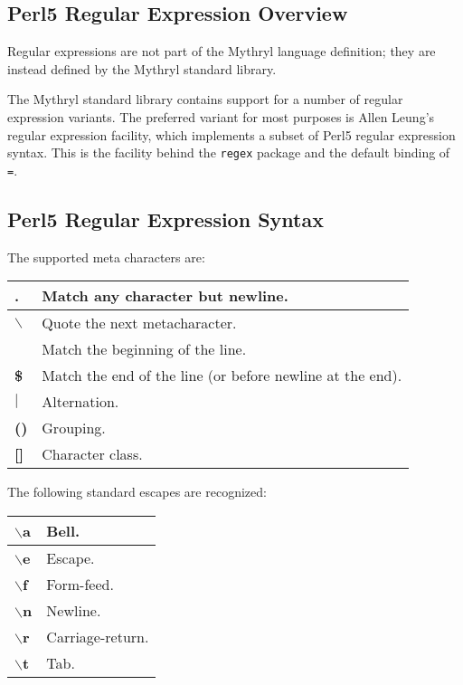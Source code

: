\subsection{Perl5 Regular Expression Overview}
\label{section:libref:perl5-regular-expressions:overview}

Regular expressions are not part of the Mythryl language definition; 
they are instead defined by the Mythryl standard library.

The Mythryl standard library contains support for a number of 
regular expression variants.  The preferred variant for most 
purposes is Allen Leung's regular expression facility, which 
implements a subset of Perl5 regular expression syntax. 
This is the facility behind the {\tt regex} package and 
the default binding of {\tt =}.

\cutend*

\subsection{Perl5 Regular Expression Syntax}
\label{section:libref:perl5-regular-expressions}

The supported meta characters are:

\begin{tabular}{|l|l|} \hline
{\bf .} &  Match any character but newline. \\ \hline
{\bf $\backslash$} &  Quote the next metacharacter. \\ \hline
{\bf \char94} &  Match the beginning of the line. \\ \hline
{\bf \$} &  Match the end of the line (or before newline at the end). \\ \hline
{\bf $|$} &  Alternation. \\ \hline
{\bf ()} & Grouping. \\ \hline
{\bf []} & Character class. \\ \hline
\end{tabular}

The following standard escapes are recognized: 

\begin{tabular}{|l|l|} \hline
{\bf $\backslash$a} &  Bell. \\ \hline
{\bf $\backslash$e} &  Escape. \\ \hline
{\bf $\backslash$f} &  Form-feed. \\ \hline
{\bf $\backslash$n} &  Newline. \\ \hline
{\bf $\backslash$r} &  Carriage-return. \\ \hline
{\bf $\backslash$t} &  Tab. \\ \hline
\end{tabular}

